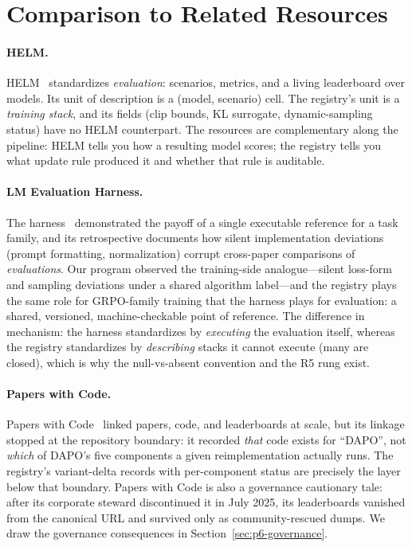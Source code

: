\section{Comparison to Related Resources}
\label{sec:p6-related-resources}

\paragraph{HELM.}
HELM~\citep{liang2022helm} standardizes \emph{evaluation}: scenarios, metrics,
and a living leaderboard over models. Its unit of description is a
(model, scenario) cell. The registry's unit is a \emph{training stack}, and
its fields (clip bounds, KL surrogate, dynamic-sampling status) have no HELM
counterpart. The resources are complementary along the pipeline: HELM tells
you how a resulting model scores; the registry tells you what update rule
produced it and whether that rule is auditable.

\paragraph{LM Evaluation Harness.}
The harness~\citep{gao2021harness} demonstrated the payoff of a single
executable reference for a task family, and its retrospective
\citep{biderman2024lessons} documents how silent implementation deviations
(prompt formatting, normalization) corrupt cross-paper comparisons of
\emph{evaluations}. Our program observed the training-side analogue---silent
loss-form and sampling deviations under a shared algorithm label---and the
registry plays the same role for GRPO-family training that the harness plays
for evaluation: a shared, versioned, machine-checkable point of reference. The
difference in mechanism: the harness standardizes by \emph{executing} the
evaluation itself, whereas the registry standardizes by \emph{describing}
stacks it cannot execute (many are closed), which is why the null-vs-absent
convention and the R5 rung exist.

\paragraph{Papers with Code.}
Papers with Code~\citep{paperswithcode2025} linked papers, code, and
leaderboards at scale, but its linkage stopped at the repository boundary: it
recorded \emph{that} code exists for ``DAPO'', not \emph{which} of DAPO's five
components a given reimplementation actually runs. The registry's
variant-delta records with per-component status are precisely the layer below
that boundary. Papers with Code is also a governance cautionary tale: after
its corporate steward discontinued it in July 2025, its leaderboards vanished
from the canonical URL and survived only as community-rescued dumps. We draw
the governance consequences in Section~\ref{sec:p6-governance}.

